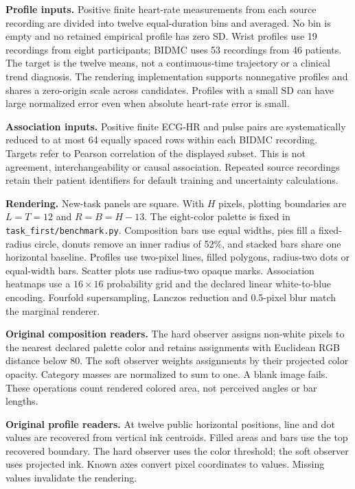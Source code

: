 \documentclass[10pt]{article}
\begin{document}
\textbf{Profile inputs.} Positive finite heart-rate measurements from each source recording are divided into twelve equal-duration bins and averaged. No bin is empty and no retained empirical profile has zero SD. Wrist profiles use 19 recordings from eight participants; BIDMC uses 53 recordings from 46 patients. The target is the twelve means, not a continuous-time trajectory or a clinical trend diagnosis. The rendering implementation supports nonnegative profiles and shares a zero-origin scale across candidates. Profiles with a small SD can have large normalized error even when absolute heart-rate error is small.

\textbf{Association inputs.} Positive finite ECG-HR and pulse pairs are systematically reduced to at most 64 equally spaced rows within each BIDMC recording. Targets refer to Pearson correlation of the displayed subset. This is not agreement, interchangeability or causal association. Repeated source recordings retain their patient identifiers for default training and uncertainty calculations.

\textbf{Rendering.} New-task panels are square. With $H$ pixels, plotting boundaries are $L=T=12$ and $R=B=H-13$. The eight-color palette is fixed in \texttt{task\_first/benchmark.py}. Composition bars use equal widths, pies fill a fixed-radius circle, donuts remove an inner radius of 52\%, and stacked bars share one horizontal baseline. Profiles use two-pixel lines, filled polygons, radius-two dots or equal-width bars. Scatter plots use radius-two opaque marks. Association heatmaps use a $16\times16$ probability grid and the declared linear white-to-blue encoding. Fourfold supersampling, Lanczos reduction and 0.5-pixel blur match the marginal renderer.

\textbf{Original composition readers.} The hard observer assigns non-white pixels to the nearest declared palette color and retains assignments with Euclidean RGB distance below 80. The soft observer weights assignments by their projected color opacity. Category masses are normalized to sum to one. A blank image fails. These operations count rendered colored area, not perceived angles or bar lengths.

\textbf{Original profile readers.} At twelve public horizontal positions, line and dot values are recovered from vertical ink centroids. Filled areas and bars use the top recovered boundary. The hard observer uses the color threshold; the soft observer uses projected ink. Known axes convert pixel coordinates to values. Missing values invalidate the rendering.
\end{document}
